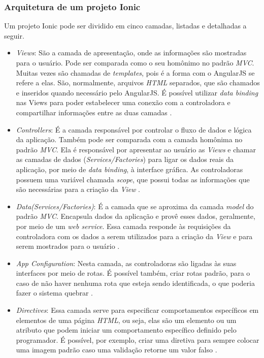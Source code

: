 \subsubsection{Arquitetura de um projeto Ionic} \label{subsubsection:arc-ionic}

Um projeto Ionic pode ser dividido em cinco camadas, listadas e detalhadas a seguir.

\begin{itemize}
    \item \textit{Views}: São a camada de apresentação, onde as informações são mostradas para o usuário. Pode ser comparada como 
    o seu homônimo no padrão \textit{MVC}. Muitas vezes são chamadas de \textit{templates}, pois é a forma com o AngularJS 
    se refere a elas. São, normalmente, arquivos \textit{HTML} separados, que são chamados e inseridos quando necessário pelo
    AngularJS. É possível utilizar \textit{data binding} nas Views para poder estabelecer uma conexão com a controladora
    e compartilhar informações entre as duas camadas \cite{drifty_ionic_2016}.
    \item \textit{Controllers}: É a camada responsável por controlar o fluxo de dados e lógica da aplicação. Também pode ser
    comparada com a camada homônima no padrão \textit{MVC}. Ela é responsável por apresentar ao usuário as \textit{Views} e chamar as camadas
    de dados (\textit{Services/Factories}) para ligar os dados reais da aplicação, por meio de \textit{data binding}, à interface
    gráfica. As controladoras possuem uma variável chamada \textit{scope}, que possui todas as informações que são necessárias 
    para a criação da \textit{View} \cite{drifty_ionic_2016}.
    \item \textit{Data(Services/Factories)}: É a camada que se aproxima da camada \textit{model} do padrão \textit{MVC}. Encapsula
    dados da aplicação e provê esses dados, geralmente, por meio de um \textit{web service}. Essa camada responde às requisições
    da controladora com os dados a serem utilizados para a criação da \textit{View} e para serem mostrados para o usuário \cite{drifty_ionic_2016}. 
    \item \textit{App Configuration}: Nesta camada, as controladoras são ligadas às suas interfaces por meio de rotas. É possível
    também, criar rotas padrão, para o caso de não haver nenhuma rota que esteja sendo identificada, o que poderia fazer o sistema quebrar \cite{drifty_ionic_2016}.
    \item \textit{Directives}: Essa camada serve para especificar comportamentos específicos em elementos de uma página 
    \textit{HTML}, ou seja, elas são um elemento ou um atributo que podem iniciar um comportamento específico definido 
    pelo programador. É possível, por exemplo, criar uma diretiva para sempre colocar uma imagem padrão caso uma validação 
    retorne um valor falso \cite{drifty_ionic_2016}.
\end{itemize}

